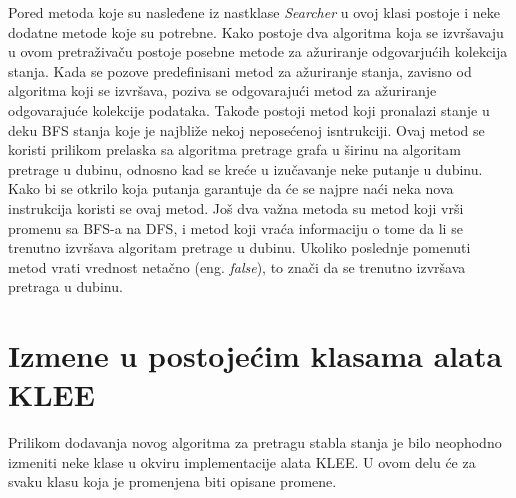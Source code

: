 \documentclass[12pt,oneside]{memoir}
\begin{document}
Pored metoda koje su nasleđene iz nastklase \textit{Searcher} u ovoj klasi postoje i neke dodatne metode koje su potrebne. Kako postoje dva algoritma koja se izvršavaju u ovom pretraživaču postoje posebne metode za ažuriranje odgovarjućih kolekcija stanja. Kada se pozove predefinisani metod za ažuriranje stanja, zavisno od algoritma koji se izvršava, poziva se odgovarajući metod za ažuriranje odgovarajuće kolekcije podataka. Takođe postoji metod koji pronalazi stanje u deku BFS stanja koje je najbliže nekoj neposećenoj isntrukciji. Ovaj metod se koristi prilikom prelaska sa algoritma pretrage grafa u širinu na algoritam pretrage u dubinu, odnosno kad se kreće u izučavanje neke putanje u dubinu. Kako bi se otkrilo koja putanja garantuje da će se najpre naći neka nova instrukcija koristi se ovaj metod. Još dva važna metoda su metod koji vrši promenu sa BFS-a na DFS, i metod koji vraća informaciju o tome da li se trenutno izvršava algoritam pretrage u dubinu. Ukoliko poslednje pomenuti metod vrati vrednost netačno (eng. \textit{false}), to znači da se trenutno izvršava pretraga u dubinu.

\section{Izmene u postojećim klasama alata KLEE} \label{izmene}
Prilikom dodavanja novog algoritma za pretragu stabla stanja je bilo neophodno izmeniti neke klase u okviru implementacije alata KLEE. U ovom delu će za svaku klasu koja je promenjena biti opisane promene.
\end{document}
